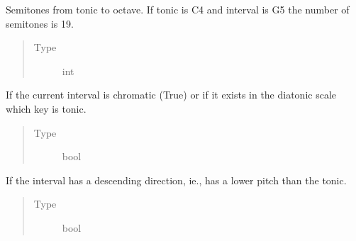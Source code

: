 \documentclass[letterpaper,10pt,english]{sphinxmanual}
\begin{document}
\begin{fulllineitems}
\begin{fulllineitems}
\begin{quote}
\begin{description}
\end{description}\end{quote}

\end{fulllineitems}


\begin{fulllineitems}
\label{\detokenize{birdears:birdears.interval.Interval.semitones}}
Semitones from tonic to octave. If tonic is C4 and
interval is G5 the number of semitones is 19.
\begin{quote}\begin{description}
\item[{Type}] \leavevmode
int

\end{description}\end{quote}

\end{fulllineitems}


\begin{fulllineitems}
\label{\detokenize{birdears:birdears.interval.Interval.is_chromatic}}
If the current interval is chromatic (True) or if
it exists in the diatonic scale which key is tonic.
\begin{quote}\begin{description}
\item[{Type}] \leavevmode
bool

\end{description}\end{quote}

\end{fulllineitems}


\begin{fulllineitems}
\label{\detokenize{birdears:birdears.interval.Interval.is_descending}}
If the interval has a descending direction, ie.,
has a lower pitch than the tonic.
\begin{quote}\begin{description}
\item[{Type}] \leavevmode
bool


\end{description}
\end{quote}
\end{fulllineitems}
\end{fulllineitems}
\end{document}
